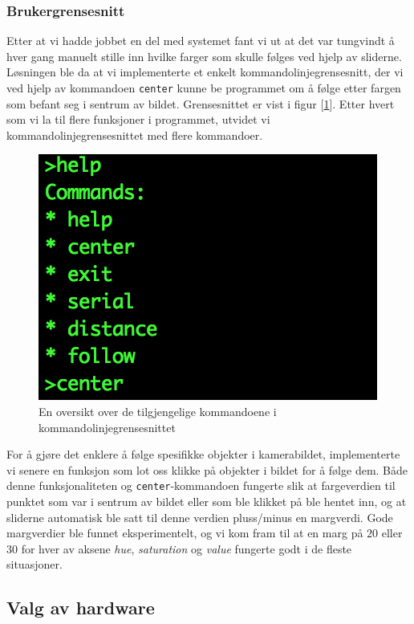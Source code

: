 \subsubsection{Brukergrensesnitt}

Etter at vi hadde jobbet en del med systemet fant vi ut at det var tungvindt å hver gang manuelt stille inn hvilke farger som skulle følges ved hjelp av sliderne. Løsningen ble da at vi implementerte et enkelt kommandolinjegrensesnitt, der vi ved hjelp av kommandoen \texttt{center} kunne be programmet om å følge etter fargen som befant seg i sentrum av bildet. Grensesnittet er vist i figur [\ref{fig:commandmenu}]. Etter hvert som vi la til flere funksjoner i programmet, utvidet vi kommandolinjegrensesnittet med flere kommandoer.

\begin{figure}[h!]
	\centering
	\includegraphics[scale=0.8]{img/command-menu.png}
	\caption{En oversikt over de tilgjengelige kommandoene i kommandolinjegrensesnittet}
	\label{fig:commandmenu}
\end{figure}

For å gjøre det enklere å følge spesifikke objekter i kamerabildet, implementerte vi senere en funksjon som lot oss klikke på objekter i bildet for å følge dem. Både denne funksjonaliteten og \texttt{center}-kommandoen fungerte slik at fargeverdien til punktet som var i sentrum av bildet eller som ble klikket på ble hentet inn, og at sliderne automatisk ble satt til denne verdien pluss/minus en margverdi. Gode margverdier ble funnet eksperimentelt, og vi kom fram til at en marg på $20$ eller $30$ for hver av aksene \emph{hue}, \emph{saturation} og \emph{value} fungerte godt i de fleste situasjoner.

\subsection{Valg av hardware}
